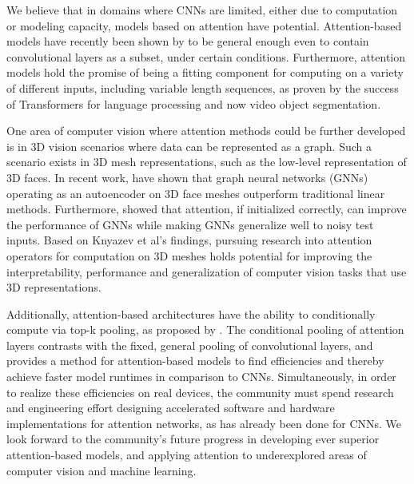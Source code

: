 We believe that in domains where CNNs are limited, either due to computation or
modeling capacity, models based on attention have potential.
Attention-based models have recently been shown by \citet{Cordonnier2020On} to
be general enough even to contain convolutional layers as a subset, under
certain conditions.
Furthermore, attention models hold the promise of being a fitting component for
computing on a variety of different inputs, including variable length
sequences, as proven by the success of Transformers for language processing and
now video object segmentation.

One area of computer vision where attention methods could be further developed
is in 3D vision scenarios where data can be represented as a graph.
Such a scenario exists in 3D mesh representations, such as the low-level
representation of 3D faces.
In recent work, \citet{ranjan2018generating} have shown that graph neural
networks (GNNs) operating as an autoencoder on 3D face meshes outperform
traditional linear methods.
Furthermore, \citet{knyazev2019generalization} showed that attention, if
initialized correctly, can improve the performance of GNNs while making GNNs
generalize well to noisy test inputs.
Based on Knyazev et al's findings, pursuing research into attention operators
for computation on 3D meshes holds potential for improving the
interpretability, performance and generalization of computer vision tasks that
use 3D representations.

Additionally, attention-based architectures have the ability to conditionally
compute via top-k pooling, as proposed by \citet{gao2019graphunets}.
The conditional pooling of attention layers contrasts with the fixed, general
pooling of convolutional layers, and provides a method for attention-based
models to find efficiencies and thereby achieve faster model runtimes in
comparison to CNNs.
Simultaneously, in order to realize these efficiencies on real devices, the
community must spend research and engineering effort designing accelerated
software and hardware implementations for attention networks, as has already
been done for CNNs.
We look forward to the community's future progress in developing ever superior
attention-based models, and applying attention to underexplored areas of
computer vision and machine learning.
